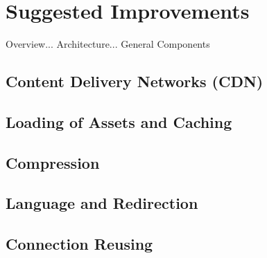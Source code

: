 \chapter{Suggested Improvements}
\label{chap:improvements}

Overview... Architecture... General Components

\section{Content Delivery Networks (CDN)}

\section{Loading of Assets and Caching}

\section{Compression}

\section{Language and Redirection}

\section{Connection Reusing}
